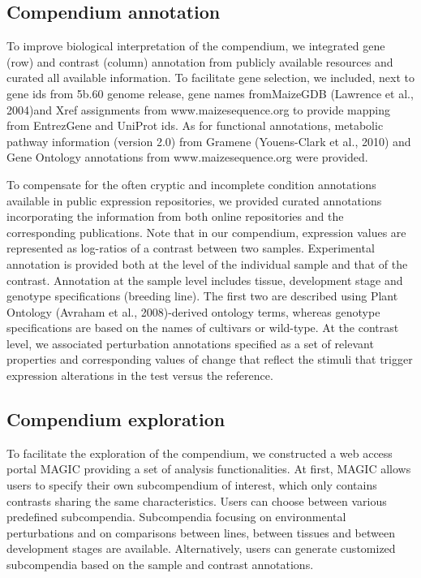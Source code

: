 \subsection{Compendium annotation}

To improve biological interpretation of the compendium, we integrated
gene (row) and contrast (column) annotation from publicly available 
resources and curated all available information.
To facilitate gene selection, we included, next to gene ids from 5b.60
genome release, gene names fromMaizeGDB (Lawrence et al., 2004)and
Xref assignments from www.maizesequence.org to provide mapping from
EntrezGene and UniProt ids. As for functional annotations, metabolic
pathway information (version 2.0) from Gramene (Youens-Clark et al.,
2010) and Gene Ontology annotations from www.maizesequence.org
were provided.

To compensate for the often cryptic and incomplete condition annotations 
available in public expression repositories, we provided curated
annotations incorporating the information from both online repositories
and the corresponding publications. Note that in our compendium, expression 
values are represented as log-ratios of a contrast between two
samples. Experimental annotation is provided both at the level of the
individual sample and that of the contrast. Annotation at the sample
level includes tissue, development stage and genotype specifications
(breeding line). The first two are described using Plant Ontology
(Avraham et al., 2008)-derived ontology terms, whereas genotype specifications 
are based on the names of cultivars or wild-type. At the contrast
level, we associated perturbation annotations specified as a set of relevant
properties and corresponding values of change that reflect the stimuli that
trigger expression alterations in the test versus the reference.





\subsection{Compendium exploration}

To facilitate the exploration of the compendium, we constructed a web
access portal MAGIC providing a set of analysis functionalities. At first,
MAGIC allows users to specify their own subcompendium of interest,
which only contains contrasts sharing the same characteristics. Users can
choose between various predefined subcompendia. Subcompendia focusing 
on environmental perturbations and on comparisons between lines,
between tissues and between development stages are available.
Alternatively, users can generate customized subcompendia based on
the sample and contrast annotations.

